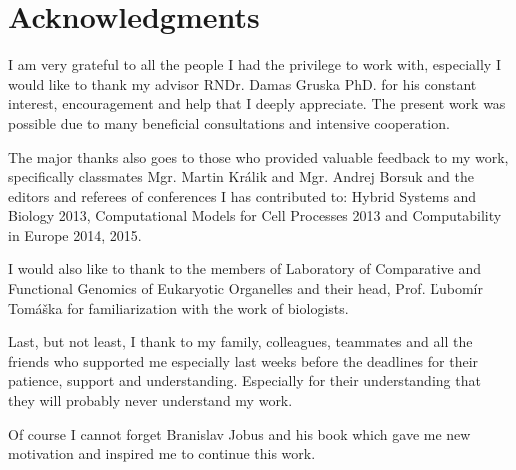\chapter*{Acknowledgments}

I am very grateful to all the people I had the privilege to work with, especially I would like to thank my advisor RNDr. Damas Gruska PhD. for his constant interest, encouragement and help that I deeply appreciate.
The present work was possible due to many beneficial consultations and intensive cooperation.

The major thanks also goes to those who provided valuable feedback to my work, specifically classmates Mgr. Martin Králik and Mgr. Andrej Borsuk and the editors and referees of conferences I has contributed to: Hybrid Systems and Biology 2013, Computational Models for Cell Processes 2013 and Computability in Europe 2014, 2015.

I would also like to thank to the members of Laboratory of Comparative and Functional Genomics of Eukaryotic Organelles and their head, Prof. Ľubomír Tomáška for familiarization with the work of biologists.

Last, but not least, I thank to my family, colleagues, teammates and all the friends who supported me especially last weeks before the deadlines for their patience, support and understanding.
\ifdefined\godzilla
  Especially for their understanding that they will probably never understand my work.

  Of course I cannot forget Branislav Jobus and his book \cite{Jobus10Ancijas} which gave me new motivation and inspired me to continue this work. 
\fi

